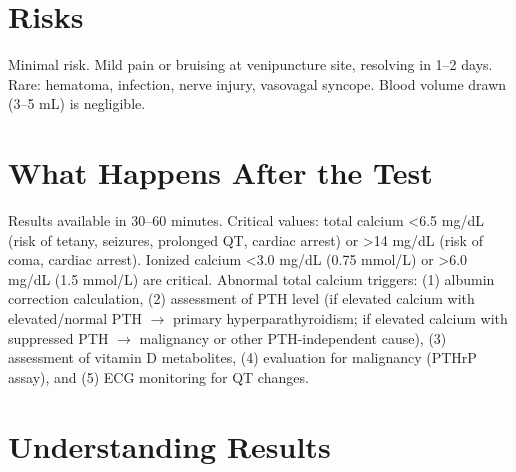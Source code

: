 \section*{Risks}
Minimal risk. Mild pain or bruising at venipuncture site, resolving in 1--2 days. Rare: hematoma, infection, nerve injury, vasovagal syncope. Blood volume drawn (3--5 mL) is negligible.

\section*{What Happens After the Test}
Results available in 30--60 minutes. Critical values: total calcium <6.5 mg/dL (risk of tetany, seizures, prolonged QT, cardiac arrest) or >14 mg/dL (risk of coma, cardiac arrest). Ionized calcium <3.0 mg/dL (0.75 mmol/L) or >6.0 mg/dL (1.5 mmol/L) are critical. Abnormal total calcium triggers: (1) albumin correction calculation, (2) assessment of PTH level (if elevated calcium with elevated/normal PTH $\rightarrow$ primary hyperparathyroidism; if elevated calcium with suppressed PTH $\rightarrow$ malignancy or other PTH-independent cause), (3) assessment of vitamin D metabolites, (4) evaluation for malignancy (PTHrP assay), and (5) ECG monitoring for QT changes.

\section*{Understanding Results}

